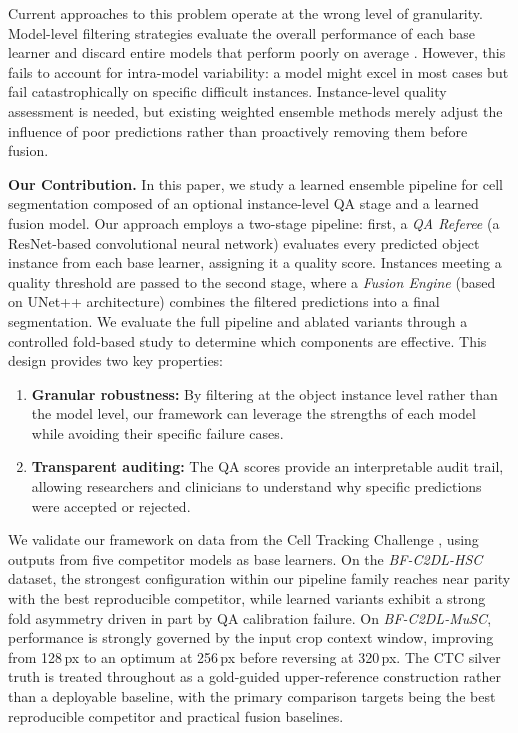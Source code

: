 Current approaches to this problem operate at the wrong level of granularity. Model-level filtering
strategies evaluate the overall performance of each base learner and discard entire models that
perform poorly on average \cite{mavska2023cell}. However, this fails to account for intra-model
variability: a model might excel in most cases but fail catastrophically on specific difficult
instances. Instance-level quality assessment is needed, but existing weighted ensemble methods
\cite{dang2021weighted} merely adjust the influence of poor predictions rather than proactively
removing them before fusion.

\textbf{Our Contribution.} In this paper, we study a learned ensemble pipeline for cell
segmentation composed of an optional instance-level QA stage and a learned fusion model. Our
approach employs a two-stage pipeline: first, a \emph{QA Referee} (a ResNet-based convolutional
neural network) evaluates every predicted object instance from each base learner, assigning it a
quality score. Instances meeting a quality threshold are passed to the second stage, where a
\emph{Fusion Engine} (based on UNet++ architecture) combines the filtered predictions into a final
segmentation. We evaluate the full pipeline and ablated variants through a controlled fold-based
study to determine which components are effective. This design provides two key properties:

\begin{enumerate}
    \item \textbf{Granular robustness:} By filtering at the object instance level rather than the model level, our framework can leverage the strengths of each model while avoiding their specific failure cases.
    \item \textbf{Transparent auditing:} The QA scores provide an interpretable audit trail, allowing researchers and clinicians to understand why specific predictions were accepted or rejected.
\end{enumerate}

We validate our framework on data from the Cell Tracking Challenge \cite{maska2023cell}, using
outputs from five competitor models as base learners. On the \textit{BF-C2DL-HSC} dataset, the
strongest configuration within our pipeline family reaches near parity with the best reproducible
competitor, while learned variants exhibit a strong fold asymmetry driven in part by QA calibration
failure. On \textit{BF-C2DL-MuSC}, performance is strongly governed by the input crop context
window, improving from 128\,px to an optimum at 256\,px before reversing at 320\,px. The CTC silver
truth is treated throughout as a gold-guided upper-reference construction rather than a deployable
baseline, with the primary comparison targets being the best reproducible competitor and practical
fusion baselines.

